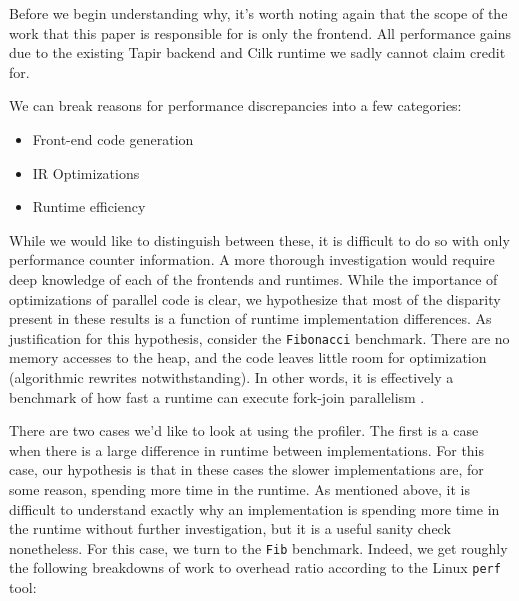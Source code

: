 \documentclass[sigconf]{acmart}
\newcommand{\wmnote}[1]{{\scriptsize \color{red} [[ Billy: #1]]}}
\begin{document}
Before we begin understanding why, it's worth noting again that the scope of the 
work that this paper is responsible for is only the frontend. All performance
gains due to the existing Tapir backend and Cilk runtime we sadly cannot claim
credit for. 

We can break reasons for performance discrepancies into a few categories: 

\begin{itemize}
\item Front-end code generation
\item IR Optimizations
\item Runtime efficiency
\end{itemize}

While we would like to distinguish between these, it is difficult to do so with
only performance counter information. A more thorough investigation would
require deep knowledge of each of the frontends and runtimes. While the
importance of optimizations of parallel code is clear, we hypothesize that most
of the disparity present in these results is a function of runtime
implementation differences. As justification for this hypothesis, consider
the \texttt{Fibonacci} benchmark. There are no memory accesses to the heap, 
and the code leaves little room for optimization (algorithmic rewrites
notwithstanding). In other words, it is effectively a benchmark of how fast a
runtime can execute fork-join parallelism .


There are two cases we'd like to look at using the profiler. The first is a 
case when there is a large difference in runtime between implementations. For 
this case, our hypothesis is that in these cases the slower implementations
are, for some reason, spending more time in the runtime. As mentioned above, 
it is difficult to understand exactly why an implementation is spending more 
time in the runtime without further investigation, but it is a useful 
sanity check nonetheless. For this case, we turn to the \texttt{Fib} benchmark.
Indeed, we get roughly the following breakdowns of work to overhead ratio
according to the Linux \texttt{perf} tool:
\end{document}

